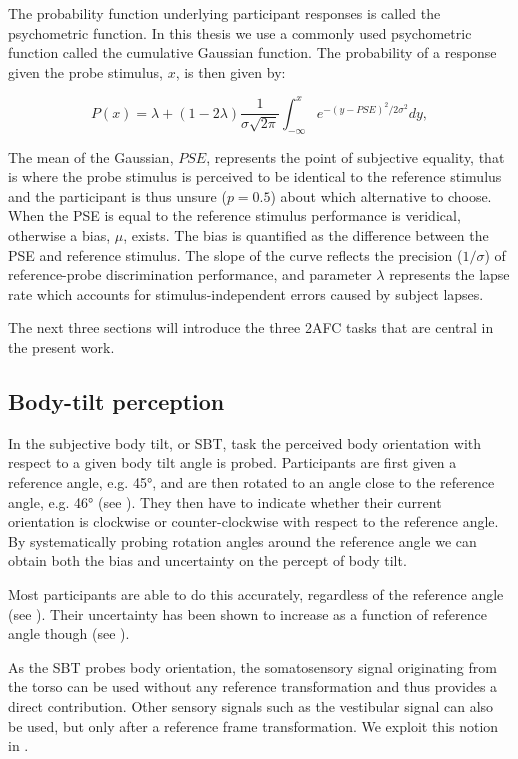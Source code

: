 The probability function underlying participant responses is called the psychometric function. In this thesis we use a commonly used psychometric function called the cumulative Gaussian function. The probability of a response given the probe stimulus, $x$, is then given by:

\begin{equation}
P(x) = \lambda + (1 - 2\lambda) \frac{1}{\sigma \sqrt{2\pi}} \int_{-\infty}^{x}{e^{-(y-PSE)^2 / 2\sigma^2}}dy,
\end{equation}

The mean of the Gaussian, $PSE$, represents the point of subjective equality, that is where the probe stimulus is perceived to be identical to the reference stimulus and the participant is thus unsure ($p = 0.5$) about which alternative to choose. When the PSE is equal to the reference stimulus performance is veridical, otherwise a bias, $\mu$, exists. The bias is quantified as the difference between the PSE and reference stimulus. The slope of the curve reflects the precision ($1/\sigma$) of reference-probe discrimination performance, and parameter $\lambda$ represents the lapse rate which accounts for stimulus-independent errors caused by subject lapses.

The next three sections will introduce the three 2AFC tasks that are central in the present work.

\subsection{Body-tilt perception}
In the subjective body tilt, or SBT, task the perceived body orientation with respect to a given body tilt angle is probed. Participants are first given a reference angle, e.g. 45\si{\degree}, and are then rotated to an angle close to the reference angle, e.g. 46\si{\degree} (see ). They then have to indicate whether their current orientation is clockwise or counter-clockwise with respect to the reference angle. By systematically probing rotation angles around the reference angle we can obtain both the bias and uncertainty on the percept of body tilt.

Most participants are able to do this accurately, regardless of the reference angle (see ). Their uncertainty has been shown to increase as a function of reference angle though (see ).

As the SBT probes body orientation, the somatosensory signal originating from the torso can be used without any reference transformation and thus provides a direct contribution. Other sensory signals such as the vestibular signal can also be used, but only after a reference frame transformation. We exploit this notion in .

